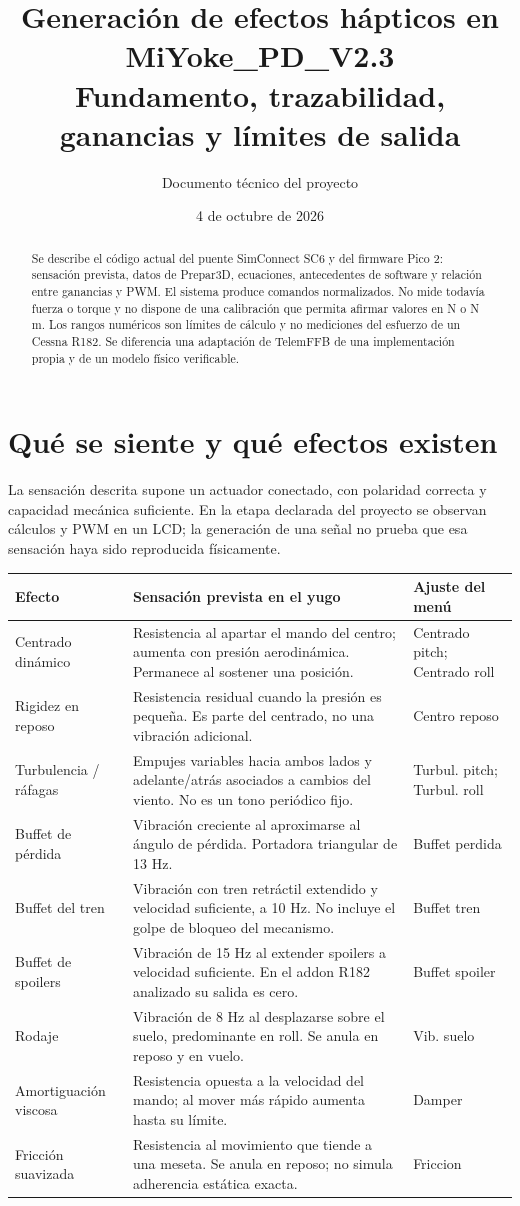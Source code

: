 \documentclass[11pt,a4paper]{article}
\title{Generación de efectos hápticos en MiYoke\_PD\_V2.3\\\large Fundamento, trazabilidad, ganancias y límites de salida}
\author{Documento técnico del proyecto}
\date{4 de octubre de 2026}
\begin{document}
\maketitle
\begin{abstract}
Se describe el código actual del puente SimConnect SC6 y del firmware Pico 2: sensación prevista, datos de Prepar3D, ecuaciones, antecedentes de software y relación entre ganancias y PWM. El sistema produce comandos normalizados. No mide todavía fuerza o torque y no dispone de una calibración que permita afirmar valores en N o N\,m. Los rangos numéricos son límites de cálculo y no mediciones del esfuerzo de un Cessna R182. Se diferencia una adaptación de TelemFFB de una implementación propia y de un modelo físico verificable.
\end{abstract}
\tableofcontents
\newpage
\section{Qué se siente y qué efectos existen}
La sensación descrita supone un actuador conectado, con polaridad correcta y capacidad mecánica suficiente. En la etapa declarada del proyecto se observan cálculos y PWM en un LCD; la generación de una señal no prueba que esa sensación haya sido reproducida físicamente.
\begin{longtable}{p{3.1cm}p{6.5cm}p{5cm}}
\toprule Efecto & Sensación prevista en el yugo & Ajuste del menú\\\midrule\endhead
Centrado dinámico & Resistencia al apartar el mando del centro; aumenta con presión aerodinámica. Permanece al sostener una posición. & Centrado pitch; Centrado roll\\
Rigidez en reposo & Resistencia residual cuando la presión es pequeña. Es parte del centrado, no una vibración adicional. & Centro reposo\\
Turbulencia / ráfagas & Empujes variables hacia ambos lados y adelante/atrás asociados a cambios del viento. No es un tono periódico fijo. & Turbul. pitch; Turbul. roll\\
Buffet de pérdida & Vibración creciente al aproximarse al ángulo de pérdida. Portadora triangular de 13 Hz. & Buffet perdida\\
Buffet del tren & Vibración con tren retráctil extendido y velocidad suficiente, a 10 Hz. No incluye el golpe de bloqueo del mecanismo. & Buffet tren\\
Buffet de spoilers & Vibración de 15 Hz al extender spoilers a velocidad suficiente. En el addon R182 analizado su salida es cero. & Buffet spoiler\\
Rodaje & Vibración de 8 Hz al desplazarse sobre el suelo, predominante en roll. Se anula en reposo y en vuelo. & Vib. suelo\\
Amortiguación viscosa & Resistencia opuesta a la velocidad del mando; al mover más rápido aumenta hasta su límite. & Damper\\
Fricción suavizada & Resistencia al movimiento que tiende a una meseta. Se anula en reposo; no simula adherencia estática exacta. & Friccion\\\bottomrule
\end{longtable}
\end{document}
